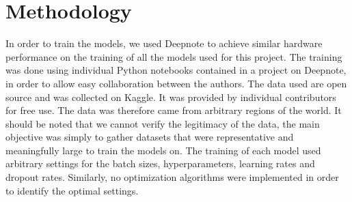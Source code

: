 \section{Methodology}
In order to train the models, we used Deepnote\cite{deepnote} to achieve similar hardware performance on the training of all the models used for this project. 
The training was done using individual Python notebooks contained in a project on Deepnote, in order to allow easy collaboration between the authors.
The data used are open source and was collected on Kaggle. It was provided by individual contributors for free use.
The data was therefore came from arbitrary regions of the world. 
It should be noted that we cannot verify the legitimacy of the data, the main objective was simply to gather datasets that were representative and meaningfully large to train the models on. 
The training of each model used arbitrary settings for the batch sizes, hyperparameters, learning rates and dropout rates. Similarly, no optimization algorithms were implemented in order to identify the optimal settings. 
